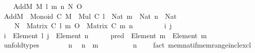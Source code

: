 \begin{isabellebody}
\ \ \isamarkupfalse%
\ AddM\ M\ l\ m\ n\ N\ O\isanewline
\ \ \isamarkupfalse%
\ {\isachardoublequoteopen}AddM\ {\isacharcolon}{\kern0pt}\ Monoid\ C{\isachardoublequoteclose}\ {\isachardoublequoteopen}M\ {\isacharcolon}{\kern0pt}\ Mul\ C{\isachardoublequoteclose}\ {\isachardoublequoteopen}l\ {\isacharcolon}{\kern0pt}\ Nat{\isachardoublequoteclose}\ {\isachardoublequoteopen}m\ {\isacharcolon}{\kern0pt}\ Nat{\isachardoublequoteclose}\ {\isachardoublequoteopen}n\ {\isacharcolon}{\kern0pt}\ Nat{\isachardoublequoteclose}\isanewline
\ \ \ \ {\isachardoublequoteopen}N\ {\isacharcolon}{\kern0pt}\ Matrix\ C\ l\ m{\isachardoublequoteclose}\ {\isachardoublequoteopen}O\ {\isacharcolon}{\kern0pt}\ Matrix\ C\ m\ n{\isachardoublequoteclose}\isanewline
\ \ \isacommand{{\isacharbraceleft}{\kern0pt}}\isamarkupfalse%
\isanewline
\ \ \ \ \isamarkupfalse%
\ i\ j\ \isamarkupfalse%
\ {\isachardoublequoteopen}i\ {\isacharcolon}{\kern0pt}\ Element\ {\isacharbrackleft}{\kern0pt}{}{\isacharcomma}{\kern0pt}{\isasymdots}{\isacharcomma}{\kern0pt}l{\isacharbrackleft}{\kern0pt}{\isachardoublequoteclose}\ {\isachardoublequoteopen}j\ {\isacharcolon}{\kern0pt}\ Element\ {\isacharbrackleft}{\kern0pt}{}{\isacharcomma}{\kern0pt}{\isasymdots}{\isacharcomma}{\kern0pt}n{\isacharbrackleft}{\kern0pt}{\isachardoublequoteclose}\isanewline
\ \ \ \ \isamarkupfalse%
\ {\isachardoublequoteopen}pred\ {\isacharcolon}{\kern0pt}\ Element\ {\isacharbrackleft}{\kern0pt}{}{\isacharcomma}{\kern0pt}{\isasymdots}{\isacharcomma}{\kern0pt}m{\isacharbrackright}{\kern0pt}\ {\isasymRightarrow}\ Element\ {\isacharbrackleft}{\kern0pt}{}{\isacharcomma}{\kern0pt}{\isasymdots}{\isacharcomma}{\kern0pt}m{\isacharbrackleft}{\kern0pt}{\isachardoublequoteclose}\isanewline
\ \ \ \ \isamarkupfalse%
\ unfold{\isacharunderscore}{\kern0pt}types\isanewline
\ \ \ \ \ \ \isamarkupfalse%
\ n\ \isamarkupfalse%
\ {\isachardoublequoteopen}n\ {\isasymin}\ {\isacharbrackleft}{\kern0pt}{}{\isacharcomma}{\kern0pt}{\isasymdots}{\isacharcomma}{\kern0pt}m{\isacharbrackright}{\kern0pt}{\isachardoublequoteclose}\isanewline
\ \ \ \ \ \ \isamarkupfalse%
\ \isamarkupfalse%
\ {\isachardoublequoteopen}n\ {\isasymin}\ {\isasymnat}{\isachardoublequoteclose}\ \isamarkupfalse%
\ {\isacharparenleft}{\kern0pt}fact\ mem{\isacharunderscore}{\kern0pt}nat{\isacharunderscore}{\kern0pt}if{\isacharunderscore}{\kern0pt}mem{\isacharunderscore}{\kern0pt}range{\isacharunderscore}{\kern0pt}incl{\isacharunderscore}{\kern0pt}excl{\isacharparenright}{\kern0pt}\isanewline

\end{isabellebody}
